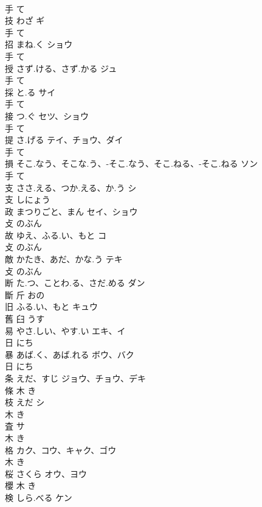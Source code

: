 \documentclass[8pt]{extreport}
\begin{document}
\begin{CJK}{UTF8}{min}
\\	手		て		
\\	技	わざ	ギ	
\\	手		て		
\\	招	まね.く	ショウ	
\\	手		て		
\\	授	さず.ける、さず.かる	ジュ	
\\	手		て		
\\	採	と.る	サイ	
\\	手		て		
\\	接	つ.ぐ	セツ、ショウ	
\\	手		て		
\\	提	さ.げる	テイ、チョウ、ダイ	
\\	手		て		
\\	損	そこ.なう、そこな.う、-そこ.なう、そこ.ねる、-そこ.ねる	ソン	
\\	手		て		
\\	支	ささ.える、つか.える、か.う	シ	
\\	支		しにょう		
\\	政	まつりごと、まん	セイ、ショウ	
\\	攴		のぶん		
\\	故	ゆえ、ふる.い、もと	コ	
\\	攴		のぶん		
\\	敵	かたき、あだ、かな.う	テキ	
\\	攴		のぶん		
\\	断	た.つ、ことわ.る、さだ.める	ダン	
\\	斷	斤		おの		
\\	旧	ふる.い、もと	キュウ	
\\	舊	臼		うす		
\\	易	やさ.しい、やす.い	エキ、イ	
\\	日		にち		
\\	暴	あば.く、あば.れる	ボウ、バク	
\\	日		にち		
\\	条	えだ、すじ	ジョウ、チョウ、デキ	
\\	條	木		き		
\\	枝	えだ	シ	
\\	木		き		
\\	査		サ	
\\	木		き		
\\	格		カク、コウ、キャク、ゴウ	
\\	木		き		
\\	桜	さくら	オウ、ヨウ	
\\	櫻	木		き		
\\	検	しら.べる	ケン	

\end{CJK}
\end{document}
